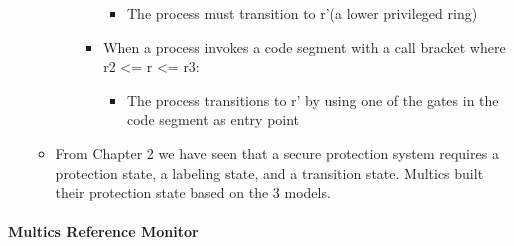 \documentclass[
  12pt]{findlay}
\providecommand{\tightlist}{%
  \setlength{\itemsep}{0pt}\setlength{\parskip}{0pt}}
\begin{document}
\begin{itemize}
\begin{itemize}
\begin{itemize}
\begin{itemize}
        \begin{itemize}
        \tightlist
        \item
          The process must transition to r'(a lower privileged ring)
        \end{itemize}
      \item
        When a process invokes a code segment with a call bracket where
        r2 \textless= r \textless= r3:

        \begin{itemize}
        \tightlist
        \item
          The process transitions to r' by using one of the gates in the
          code segment as entry point
        \end{itemize}
      \end{itemize}
    \end{itemize}
  \item
    From Chapter 2 we have seen that a secure protection system requires
    a protection state, a labeling state, and a transition state.
    Multics built their protection state based on the 3 models.
  \end{itemize}
\end{itemize}

\hypertarget{multics-reference-monitor}{%
\paragraph{Multics Reference Monitor}\label{multics-reference-monitor}}
\end{document}
